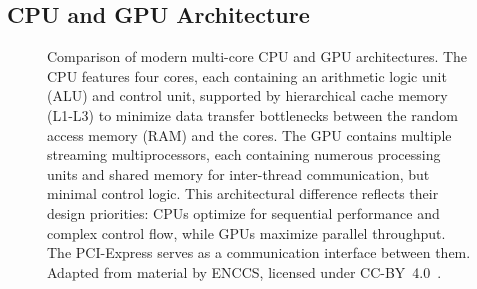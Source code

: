 \documentclass[english,12pt,a4paper,pdftex,sci,utf8]{aaltothesis}
\begin{document}
\subsection{CPU and GPU Architecture}
 \begin{figure}[tbp]
  \centering
  \caption{Comparison of modern multi-core CPU and GPU architectures. The CPU features four cores, each containing an arithmetic logic unit (ALU) and control unit, supported by hierarchical cache memory (L1-L3) to minimize data transfer bottlenecks between the random access memory (RAM) and the cores. The GPU contains multiple streaming multiprocessors, each containing numerous processing units and shared memory for inter-thread communication, but minimal control logic. This architectural difference reflects their design priorities: CPUs optimize for sequential performance and complex control flow, while GPUs maximize parallel throughput. The PCI-Express serves as a communication interface between them. Adapted from material by ENCCS, licensed under \mbox{CC-BY 4.0 \cite{enccs2025gpu}.}}
  \label{fig:cpu-gpu-architecture}
\end{figure}
\end{document}
